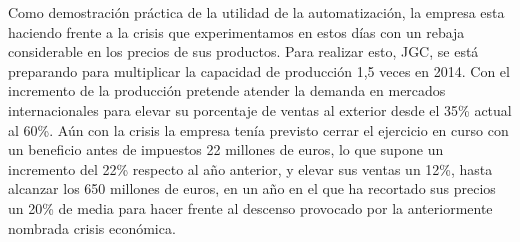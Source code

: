 \documentclass[11pt,a4paper,spanish,twoside]{report}
\begin{document}

Como demostración práctica de la utilidad de la automatización, la empresa
esta haciendo frente a la crisis que experimentamos en estos días con un
rebaja considerable en los precios de sus productos. Para realizar esto, JGC,
se está preparando para multiplicar la capacidad de producción 1,5 veces en
2014. Con el incremento de la producción pretende atender la demanda en
mercados internacionales para elevar su porcentaje de ventas al exterior
desde el 35\% actual al 60\%. Aún con la crisis la empresa tenía previsto
cerrar el ejercicio en curso con un beneficio antes de impuestos 22 millones
de euros, lo que supone un incremento del 22\% respecto al año anterior, y
elevar sus ventas un 12\%, hasta alcanzar los 650 millones de euros, en un
año en el que ha recortado sus precios un 20\% de media para hacer frente al
descenso provocado por la anteriormente nombrada crisis económica.

 

\end{document}
